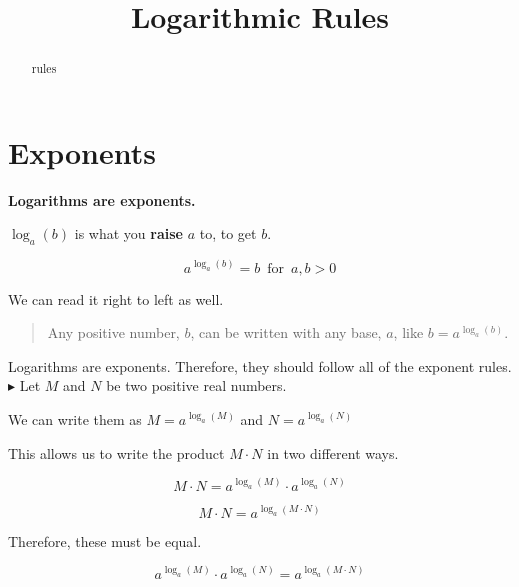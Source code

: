 \documentclass{ximera}
\title{Logarithmic Rules}
\begin{document}
\begin{abstract}
rules
\end{abstract}
\maketitle
















\section{Exponents}



\begin{center}
\textbf{\textcolor{red!90!darkgray}{Logarithms are exponents.}}
\end{center}

$\log_a(b)$ is what you \textbf{\textcolor{red!90!darkgray}{raise}} $a$ to, to get $b$.

\[    a^{\log_a(b)}  = b    \, \text{ for } \,  a,b > 0     \]


We can read it right to left as well.  


\begin{quote}
Any positive number, $b$, can be written with any base, $a$, like $b = a^{\log_a(b)}$.
\end{quote}



Logarithms are exponents. Therefore, they should follow all of the exponent rules. \\



$\blacktriangleright$  Let $M$ and $N$ be two positive real numbers.

We can write them as $M = a^{\log_a(M)}$ and $N = a^{\log_a(N)}$


This allows us to write the product $M \cdot N$ in two different ways.



\[   M \cdot N = a^{\log_a(M)} \cdot a^{\log_a(N)}                    \]

\[   M \cdot N = a^{\log_a(M \cdot N)}                  \]


Therefore, these must be equal.


\[    a^{\log_a(M)} \cdot a^{\log_a(N)}     =   a^{\log_a(M \cdot N)}                \]
\end{document}
